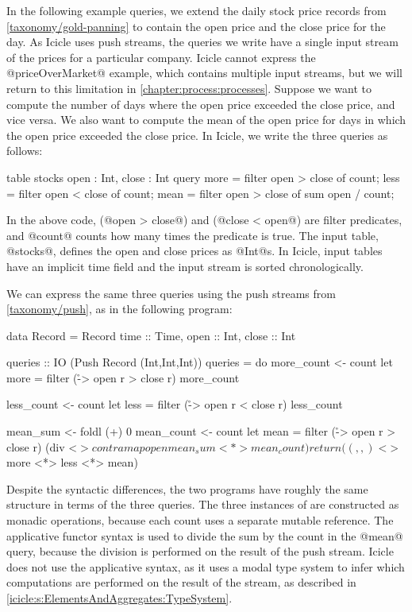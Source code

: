 In the following example queries, we extend the daily stock price records from \cref{taxonomy/gold-panning} to contain the open price and the close price for the day.
As Icicle uses push streams, the queries we write have a single input stream of the prices for a particular company.
Icicle cannot express the @priceOverMarket@ example, which contains multiple input streams, but we will return to this limitation in \cref{chapter:process:processes}.
Suppose we want to compute the number of days where the open price exceeded the close price, and vice versa.
We also want to compute the mean of the open price for days in which the open price exceeded the close price.
In Icicle, we write the three queries as follows:

\begin{icicle}
table stocks { open : Int, close : Int }
query 
  more = filter open > close of count;
  less = filter open < close of count;
  mean = filter open > close of sum open / count;
\end{icicle}

In the above code, (@open > close@) and (@close < open@) are filter predicates, and @count@ counts how many times the predicate is true.
The input table, @stocks@, defines the open and close prices as @Int@s.
In Icicle, input tables have an implicit time field and the input stream is sorted chronologically.

We can express the same three queries using the push streams from \cref{taxonomy/push}, as in the following program:

\begin{haskell}
data Record = Record
 { time :: Time, open :: Int, close :: Int }

queries :: IO (Push Record (Int,Int,Int))
queries = do
  more_count <- count
  let more = filter (\r -> open r > close r) more_count

  less_count <- count
  let less = filter (\r -> open r < close r) less_count

  mean_sum   <- foldl (+) 0
  mean_count <- count
  let mean = filter (\r -> open r > close r)
                    (div <$> contramap open mean_sum <*> mean_count)
  return ((,,) <$> more <*> less <*> mean)
\end{haskell}

Despite the syntactic differences, the two programs have roughly the same structure in terms of the three queries.
The three instances of \Hs@count@ are constructed as monadic \Hs@IO@ operations, because each count uses a separate mutable reference.
The applicative functor syntax is used to divide the sum by the count in the @mean@ query, because the division is performed on the result of the push stream.
Icicle does not use the applicative syntax, as it uses a modal type system to infer which computations are performed on the result of the stream, as described in \cref{icicle:s:ElementsAndAggregates:TypeSystem}.


